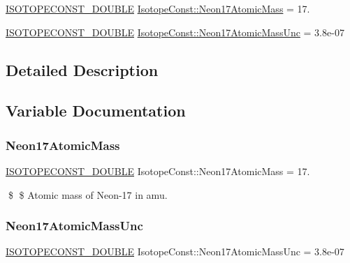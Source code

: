 \begin{DoxyCompactItemize}
\item 
\mbox{\hyperlink{group___isotope_const-_macros_ga8f45a7272ce02c0b4c65c44636ed719a}{I\+S\+O\+T\+O\+P\+E\+C\+O\+N\+S\+T\+\_\+\+D\+O\+U\+B\+LE}} \mbox{\hyperlink{group___isotope_const-_neon-_ne17_ga796040c07198e3b9ef18d9babf3c7a5f}{Isotope\+Const\+::\+Neon17\+Atomic\+Mass}} = 17.
\item 
\mbox{\hyperlink{group___isotope_const-_macros_ga8f45a7272ce02c0b4c65c44636ed719a}{I\+S\+O\+T\+O\+P\+E\+C\+O\+N\+S\+T\+\_\+\+D\+O\+U\+B\+LE}} \mbox{\hyperlink{group___isotope_const-_neon-_ne17_ga5ba37ed168e5ae8ee91093e6279e7fd9}{Isotope\+Const\+::\+Neon17\+Atomic\+Mass\+Unc}} = 3.\+8e-\/07
\end{DoxyCompactItemize}


\subsection{Detailed Description}


\subsection{Variable Documentation}
\mbox{\label{group___isotope_const-_neon-_ne17_ga796040c07198e3b9ef18d9babf3c7a5f}} 
\subsubsection{\texorpdfstring{Neon17\+Atomic\+Mass}{Neon17AtomicMass}}
{\footnotesize\ttfamily \mbox{\hyperlink{group___isotope_const-_macros_ga8f45a7272ce02c0b4c65c44636ed719a}{I\+S\+O\+T\+O\+P\+E\+C\+O\+N\+S\+T\+\_\+\+D\+O\+U\+B\+LE}} Isotope\+Const\+::\+Neon17\+Atomic\+Mass = 17.}

\$ \$ Atomic mass of Neon-\/17 in amu. \mbox{\label{group___isotope_const-_neon-_ne17_ga5ba37ed168e5ae8ee91093e6279e7fd9}} 
\subsubsection{\texorpdfstring{Neon17\+Atomic\+Mass\+Unc}{Neon17AtomicMassUnc}}
{\footnotesize\ttfamily \mbox{\hyperlink{group___isotope_const-_macros_ga8f45a7272ce02c0b4c65c44636ed719a}{I\+S\+O\+T\+O\+P\+E\+C\+O\+N\+S\+T\+\_\+\+D\+O\+U\+B\+LE}} Isotope\+Const\+::\+Neon17\+Atomic\+Mass\+Unc = 3.\+8e-\/07}

